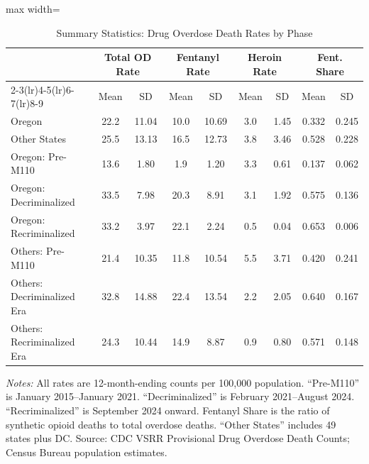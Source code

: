 \begin{table}[H]
\centering
\caption{Summary Statistics: Drug Overdose Death Rates by Phase}
\label{tab:summary}
\begin{adjustbox}{max width=\textwidth}
\begin{threeparttable}
\begin{tabular}{lcccccccc}
\toprule
 & \multicolumn{2}{c}{Total OD Rate} & \multicolumn{2}{c}{Fentanyl Rate} & \multicolumn{2}{c}{Heroin Rate} & \multicolumn{2}{c}{Fent. Share} \\
\cmidrule(lr){2-3}\cmidrule(lr){4-5}\cmidrule(lr){6-7}\cmidrule(lr){8-9}
 & Mean & SD & Mean & SD & Mean & SD & Mean & SD \\
\midrule
Oregon & 22.2 & 11.04 & 10.0 & 10.69 & 3.0 & 1.45 & 0.332 & 0.245 \\
Other States & 25.5 & 13.13 & 16.5 & 12.73 & 3.8 & 3.46 & 0.528 & 0.228 \\
\midrule
Oregon: Pre-M110 & 13.6 & 1.80 & 1.9 & 1.20 & 3.3 & 0.61 & 0.137 & 0.062 \\
Oregon: Decriminalized & 33.5 & 7.98 & 20.3 & 8.91 & 3.1 & 1.92 & 0.575 & 0.136 \\
Oregon: Recriminalized & 33.2 & 3.97 & 22.1 & 2.24 & 0.5 & 0.04 & 0.653 & 0.006 \\
Others: Pre-M110 & 21.4 & 10.35 & 11.8 & 10.54 & 5.5 & 3.71 & 0.420 & 0.241 \\
Others: Decriminalized Era & 32.8 & 14.88 & 22.4 & 13.54 & 2.2 & 2.05 & 0.640 & 0.167 \\
Others: Recriminalized Era & 24.3 & 10.44 & 14.9 & 8.87 & 0.9 & 0.80 & 0.571 & 0.148 \\
\bottomrule
\end{tabular}
\begin{tablenotes}[flushleft]
\small
\item \textit{Notes:} All rates are 12-month-ending counts per 100,000 population. ``Pre-M110'' is January 2015--January 2021. ``Decriminalized'' is February 2021--August 2024. ``Recriminalized'' is September 2024 onward. Fentanyl Share is the ratio of synthetic opioid deaths to total overdose deaths. ``Other States'' includes 49 states plus DC. Source: CDC VSRR Provisional Drug Overdose Death Counts; Census Bureau population estimates.
\end{tablenotes}
\end{threeparttable}
\end{adjustbox}
\end{table}
